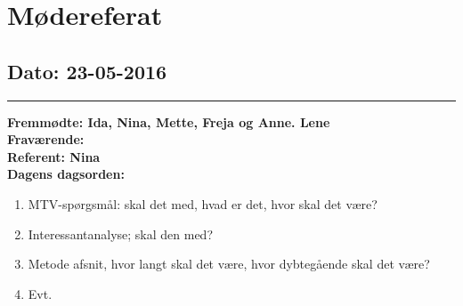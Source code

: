 \chapter{Mødereferat}

\section{Dato: 23-05-2016}
\hrule
\textbf{Fremmødte: Ida, Nina, Mette, Freja og Anne. Lene} \\
\textbf{Fraværende:} \\
\textbf{Referent: Nina } \\
\textbf{Dagens dagsorden: }
\begin{enumerate}
\item MTV-spørgsmål: skal det med, hvad er det, hvor skal det være?
\item Interessantanalyse; skal den med?
\item Metode afsnit, hvor langt skal det være, hvor dybtegående skal det være?
\item Evt.
\end{enumerate}

